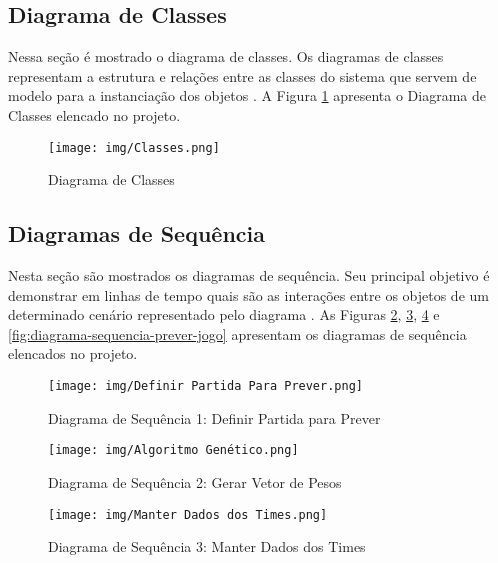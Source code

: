 \documentclass[brazilian]{ifsc-tcc}
\begin{document}
\newpage

\subsection{Diagrama de Classes}
Nessa seção é mostrado o diagrama de classes. Os diagramas de classes representam a estrutura e relações entre as classes do sistema que servem de modelo para a instanciação dos objetos \cite{diagrama-classes}. A Figura \ref{fig:diagrama-classes} apresenta o Diagrama de Classes elencado no projeto.

\begin{figure} [H]
    \centering
    \caption{Diagrama de Classes}
    \texttt{[image: img/Classes.png]}
    \label{fig:diagrama-classes}
\end{figure}


\subsection{Diagramas de Sequência}
Nesta seção são mostrados os diagramas de sequência. Seu principal objetivo é demonstrar em linhas de tempo quais são as interações entre os objetos de um determinado cenário representado pelo diagrama \cite{diagrama-sequencia}. As Figuras \ref{fig:diagrama-sequencia-definir-jogo}, \ref{fig:diagrama-sequencia-gerar-vetor}, \ref{fig:diagrama-sequencia-manter-dados} e \ref{fig:diagrama-sequencia-prever-jogo} apresentam os diagramas de sequência elencados no projeto.

\begin{figure}[H]
    \centering
    \caption{Diagrama de Sequência 1: Definir Partida para Prever}
    \texttt{[image: img/Definir Partida Para Prever.png]}
    \label{fig:diagrama-sequencia-definir-jogo}
\end{figure}

\begin{figure}[H]
    \centering
    \caption{Diagrama de Sequência 2: Gerar Vetor de Pesos}
    \texttt{[image: img/Algoritmo Genético.png]}
    \label{fig:diagrama-sequencia-gerar-vetor}
\end{figure}

\begin{figure}[H]
    \centering
    \caption{Diagrama de Sequência 3: Manter Dados dos Times}
    \texttt{[image: img/Manter Dados dos Times.png]}
    \label{fig:diagrama-sequencia-manter-dados}
\end{figure}
\end{document}
